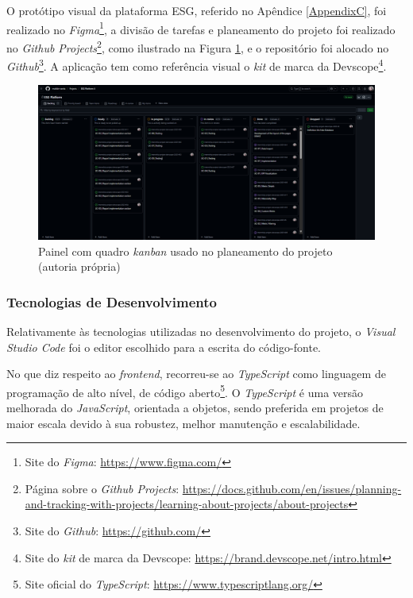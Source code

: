 O protótipo visual da plataforma \gls{ESG}, referido no Apêndice \ref{AppendixC}, foi realizado no \textit{Figma}\footnote{Site do \textit{Figma}: \url{https://www.figma.com/}}, a divisão de tarefas e planeamento do projeto foi realizado no \textit{Github Projects}\footnote{Página sobre o \textit{Github Projects}: \url{https://docs.github.com/en/issues/planning-and-tracking-with-projects/learning-about-projects/about-projects}}, como ilustrado na Figura \ref{fig:kanbanBoard}, e o repositório foi alocado no \textit{Github}\footnote{Site do \textit{Github}: \url{https://github.com/}}. A aplicação tem como referência visual o \textit{kit} de marca da Devscope\footnote{Site do \textit{kit} de marca da Devscope: \url{https://brand.devscope.net/intro.html}}.

\begin{figure}[H]
    \centering
    \includegraphics[width=\linewidth,keepaspectratio]{frontmatter/assets/github_projects.png}
    \caption{Painel com quadro \textit{kanban} usado no planeamento do projeto (autoria própria)}
    \label{fig:kanbanBoard}
\end{figure}

\subsubsection{Tecnologias de Desenvolvimento}

Relativamente às tecnologias utilizadas no desenvolvimento do projeto, o \textit{Visual Studio Code} foi o editor escolhido para a escrita do código-fonte.

No que diz respeito ao \textit{frontend}, recorreu-se ao \textit{TypeScript} como linguagem de programação de alto nível, de código aberto\footnote{Site oficial do \textit{TypeScript}: \url{https://www.typescriptlang.org/}}. O \textit{TypeScript} é uma versão melhorada do \textit{JavaScript}, orientada a objetos, sendo preferida em projetos de maior escala devido à sua robustez, melhor manutenção e escalabilidade.

